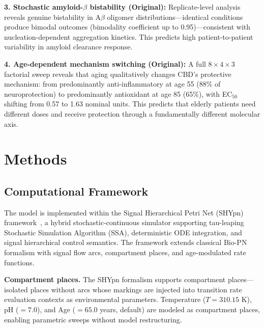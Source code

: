 \documentclass[10pt,letterpaper]{article}
\begin{document}
\vspace{3pt}
\noindent\textbf{3. Stochastic amyloid-$\beta$ bistability (Original):} Replicate-level analysis reveals genuine bistability in A$\beta$ oligomer distributions---identical conditions produce bimodal outcomes (bimodality coefficient up to 0.95)---consistent with nucleation-dependent aggregation kinetics. This predicts high patient-to-patient variability in amyloid clearance response.

\vspace{3pt}
\noindent\textbf{4. Age-dependent mechanism switching (Original):} A full $8 \times 4 \times 3$ factorial sweep reveals that aging qualitatively changes CBD's protective mechanism: from predominantly anti-inflammatory at age 55 (88\% of neuroprotection) to predominantly antioxidant at age 85 (65\%), with EC$_{50}$ shifting from 0.57 to 1.63 nominal units. This predicts that elderly patients need different doses and receive protection through a fundamentally different molecular axis.

\section{Methods}
\label{sec:methods}

\subsection{Computational Framework}

The model is implemented within the Signal Hierarchical Petri Net (SHYpn) framework~\cite{simao2026shypn}, a hybrid stochastic-continuous simulator supporting tau-leaping Stochastic Simulation Algorithm (SSA), deterministic ODE integration, and signal hierarchical control semantics. The framework extends classical Bio-PN formalism with signal flow arcs, compartment places, and age-modulated rate functions.

\vspace{3pt}
\noindent\textbf{Compartment places.} The SHYpn formalism supports compartment places---isolated places without arcs whose markings are injected into transition rate evaluation contexts as environmental parameters. Temperature ($T = 310.15$ K), pH ($= 7.0$), and Age ($= 65.0$ years, default) are modeled as compartment places, enabling parametric sweeps without model restructuring.
\end{document}
